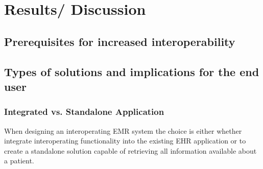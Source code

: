 \documentclass[14pt]{article}
\begin{document}

\newpage

\section{Results/ Discussion}
\label{sec:Results}

\subsection{Prerequisites for increased interoperability}

\subsection{Types of solutions and implications for the end user}

\subsubsection{Integrated vs. Standalone Application}
When designing an interoperating EMR system the choice is either whether integrate interoperating functionality into the existing EHR application or to create a standalone solution capable of retrieving all information available about a patient.
\end{document}
